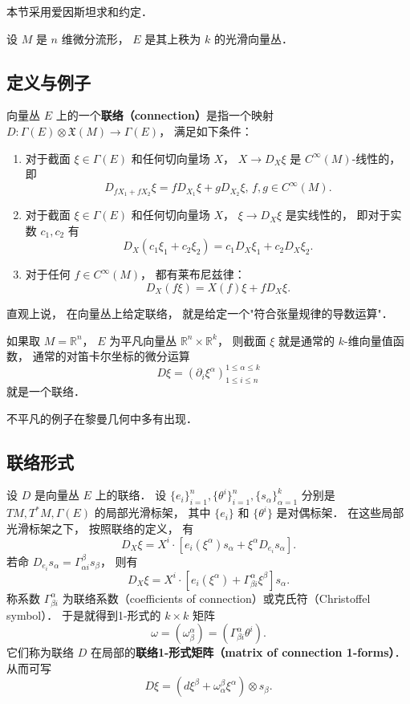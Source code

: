 
本节采用爱因斯坦求和约定．

设 $M$ 是 $n$ 维微分流形， $E$ 是其上秩为 $k$ 的光滑向量丛． 

\subsection{定义与例子}
向量丛 $E$ 上的一个\textbf{联络（connection）}是指一个映射 $D:\Gamma(E)\otimes \mathfrak{X}(M)\to\Gamma(E)$， 
满足如下条件：

\begin{enumerate}
\item 对于截面 $\xi\in\Gamma(E)$ 和任何切向量场 $X$， $X\to D_X\xi$ 是 $C^\infty(M)$-线性的， 即
$$
D_{fX_1+fX_2}\xi=fD_{X_1}\xi+gD_{X_2}\xi,\,f,g\in C^\infty(M).
$$
\item 对于截面 $\xi\in\Gamma(E)$ 和任何切向量场 $X$， $\xi\to D_X\xi$ 是实线性的， 即对于实数 $c_1,c_2$ 有
$$
D_X(c_1\xi_1+c_2\xi_2)=c_1D_X\xi_1+c_2D_X\xi_2.
$$
\item 对于任何 $f\in C^\infty(M)$， 都有莱布尼兹律：
$$
D_X(f\xi)=X(f)\xi+fD_X\xi.
$$
\end{enumerate}

直观上说， 在向量丛上给定联络， 就是给定一个"符合张量规律的导数运算"． 

如果取 $M=\mathbb{R}^n$， $E$ 为平凡向量丛 $\mathbb{R}^n\times\mathbb{R}^k$， 则截面 $\xi$ 就是通常的 $k$-维向量值函数， 通常的对笛卡尔坐标的微分运算
$$
D\xi=(\partial_i\xi^\alpha)_{1\leq i\leq n}^{1\leq\alpha\leq k}
$$
就是一个联络．

不平凡的例子在黎曼几何中多有出现．

\subsection{联络形式}
设 $D$ 是向量丛 $E$ 上的联络． 设 $\{e_i\}_{i=1}^n,\{\theta^i\}_{i=1}^n,\{s_\alpha\}_{\alpha=1}^k$ 分别是 $TM,T^*M,\Gamma(E)$ 的局部光滑标架， 其中 $\{e_i\}$ 和 $\{\theta^i\}$ 是对偶标架． 在这些局部光滑标架之下， 按照联络的定义， 有
$$
D_X\xi=X^i\cdot\left[e_i(\xi^\alpha)s_\alpha+\xi^\alpha D_{e_i}s_\alpha\right].
$$
若命 $D_{e_i}s_\alpha=\Gamma_{\alpha i}^\beta s_\beta$， 则有
$$
D_X\xi=X^i\cdot\left[e_i(\xi^\alpha)+\Gamma_{\beta i}^\alpha\xi^\beta \right]s_\alpha.
$$
称系数 $\Gamma^\alpha_{\beta i}$ 为联络系数（coefficients of connection）或克氏符（Christoffel symbol）． 于是就得到1-形式的 $k\times k$ 矩阵
$$
\omega=(\omega_\beta^\alpha)=(\Gamma_{\beta i}^\alpha\theta^i).
$$
它们称为联络 $D$ 在局部的\textbf{联络1-形式矩阵（matrix of connection 1-forms）}． 从而可写
$$
D\xi=(d\xi^\beta+\omega_\alpha^\beta\xi^\alpha)\otimes s_\beta.
$$

